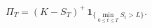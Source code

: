 \documentclass{equation-sheet}
\begin{document}
\begin{equation*}
\Pi_T=(K-S_T)^{+}\,
\mathbf{1}_{\{\min_{0\leq t\leq T}S_t>L\}}.
\end{equation*}
\end{document}
